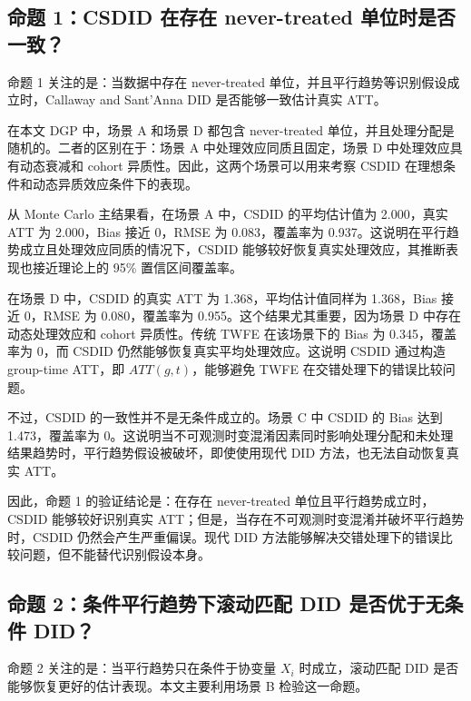 \documentclass[
  fontset=windows]{ctexart}
\begin{document}
\subsection{命题 1：CSDID 在存在 never-treated
单位时是否一致？}\label{ux547dux9898-1csdid-ux5728ux5b58ux5728-never-treated-ux5355ux4f4dux65f6ux662fux5426ux4e00ux81f4}

命题 1 关注的是：当数据中存在 never-treated
单位，并且平行趋势等识别假设成立时，Callaway and Sant'Anna DID
是否能够一致估计真实 ATT。

在本文 DGP 中，场景 A 和场景 D 都包含 never-treated
单位，并且处理分配是随机的。二者的区别在于：场景 A
中处理效应同质且固定，场景 D 中处理效应具有动态衰减和 cohort
异质性。因此，这两个场景可以用来考察 CSDID
在理想条件和动态异质效应条件下的表现。

从 Monte Carlo 主结果看，在场景 A 中，CSDID 的平均估计值为 2.000，真实
ATT 为 2.000，Bias 接近 0，RMSE 为 0.083，覆盖率为
0.937。这说明在平行趋势成立且处理效应同质的情况下，CSDID
能够较好恢复真实处理效应，其推断表现也接近理论上的 95\% 置信区间覆盖率。

在场景 D 中，CSDID 的真实 ATT 为 1.368，平均估计值同样为 1.368，Bias
接近 0，RMSE 为 0.080，覆盖率为 0.955。这个结果尤其重要，因为场景 D
中存在动态处理效应和 cohort 异质性。传统 TWFE 在该场景下的 Bias 为
0.345，覆盖率为 0，而 CSDID 仍然能够恢复真实平均处理效应。这说明 CSDID
通过构造 group-time ATT，即 \(ATT(g,t)\)，能够避免 TWFE
在交错处理下的错误比较问题。

不过，CSDID 的一致性并不是无条件成立的。场景 C 中 CSDID 的 Bias 达到
1.473，覆盖率为
0。这说明当不可观测时变混淆因素同时影响处理分配和未处理结果趋势时，平行趋势假设被破坏，即使使用现代
DID 方法，也无法自动恢复真实 ATT。

因此，命题 1 的验证结论是：在存在 never-treated
单位且平行趋势成立时，CSDID 能够较好识别真实
ATT；但是，当存在不可观测时变混淆并破坏平行趋势时，CSDID
仍然会产生严重偏误。现代 DID
方法能够解决交错处理下的错误比较问题，但不能替代识别假设本身。

\subsection{命题 2：条件平行趋势下滚动匹配 DID 是否优于无条件
DID？}\label{ux547dux9898-2ux6761ux4ef6ux5e73ux884cux8d8bux52bfux4e0bux6edaux52a8ux5339ux914d-did-ux662fux5426ux4f18ux4e8eux65e0ux6761ux4ef6-did}

命题 2 关注的是：当平行趋势只在条件于协变量 \(X_i\) 时成立，滚动匹配 DID
是否能够恢复更好的估计表现。本文主要利用场景 B 检验这一命题。
\end{document}

